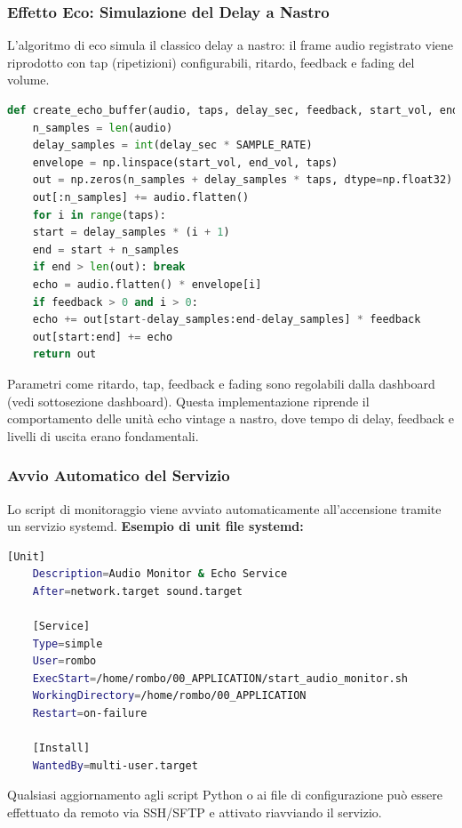 \documentclass[fleqn,10pt]{SelfArx} %
\begin{document}
\subsubsection{Effetto Eco: Simulazione del Delay a Nastro}

L’algoritmo di eco simula il classico delay a nastro: il frame audio registrato viene riprodotto con tap (ripetizioni) configurabili, ritardo, feedback e fading del volume.

\begin{lstlisting}[language=Python]
	def create_echo_buffer(audio, taps, delay_sec, feedback, start_vol, end_vol):
	n_samples = len(audio)
	delay_samples = int(delay_sec * SAMPLE_RATE)
	envelope = np.linspace(start_vol, end_vol, taps)
	out = np.zeros(n_samples + delay_samples * taps, dtype=np.float32)
	out[:n_samples] += audio.flatten()
	for i in range(taps):
	start = delay_samples * (i + 1)
	end = start + n_samples
	if end > len(out): break
	echo = audio.flatten() * envelope[i]
	if feedback > 0 and i > 0:
	echo += out[start-delay_samples:end-delay_samples] * feedback
	out[start:end] += echo
	return out
\end{lstlisting}

Parametri come ritardo, tap, feedback e fading sono regolabili dalla dashboard (vedi sottosezione dashboard).  
Questa implementazione riprende il comportamento delle unità echo vintage a nastro, dove tempo di delay, feedback e livelli di uscita erano fondamentali.

\subsubsection{Avvio Automatico del Servizio}

Lo script di monitoraggio viene avviato automaticamente all’accensione tramite un servizio systemd.  
\textbf{Esempio di unit file systemd:}

\begin{lstlisting}[language=bash]
	[Unit]
	Description=Audio Monitor & Echo Service
	After=network.target sound.target
	
	[Service]
	Type=simple
	User=rombo
	ExecStart=/home/rombo/00_APPLICATION/start_audio_monitor.sh
	WorkingDirectory=/home/rombo/00_APPLICATION
	Restart=on-failure
	
	[Install]
	WantedBy=multi-user.target
\end{lstlisting}

Qualsiasi aggiornamento agli script Python o ai file di configurazione può essere effettuato da remoto via SSH/SFTP e attivato riavviando il servizio.
\end{document}
